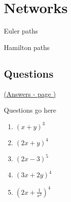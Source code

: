 \documentclass[../main.tex]{subfiles}
\begin{document}
\section{Networks}

Euler paths

Hamilton paths


\pagebreak
\hypertarget{networkslink}{\subsection*{Questions}}
\hyperlink{networksanswers}{(Answers - page {\pageref*{Networks answers}})}

\label{Networks}
Questions go here


\begin{enumerate}
    \item \( (x+y)^3 \)
    \item \( (2x+y)^4 \)
    \item \( (2x-3)^5 \)
    \item \( (3x+2y)^4 \)
    \item \( (2x + \frac{1}{x^2 } )^4 \)
\end{enumerate}
\end{document}
